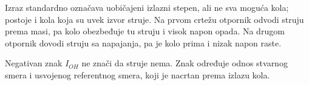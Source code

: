 Izraz standardno označava uobičajeni izlazni stepen, ali ne sva moguća kola; postoje i kola koja su uvek izvor struje. Na prvom crtežu otpornik odvodi struju prema masi, pa kolo obezbeđuje tu struju i visok napon opada. Na drugom otpornik dovodi struju sa napajanja, pa je kolo prima i nizak napon raste.

Negativan znak $I_{OH}$ ne znači da struje nema. Znak određuje odnos stvarnog smera i usvojenog referentnog smera, koji je nacrtan prema izlazu kola.
